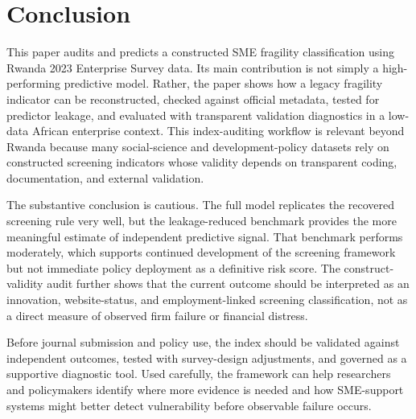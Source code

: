 \section{Conclusion}

This paper audits and predicts a constructed SME fragility classification using Rwanda 2023 Enterprise Survey data. Its main contribution is not simply a high-performing predictive model. Rather, the paper shows how a legacy fragility indicator can be reconstructed, checked against official metadata, tested for predictor leakage, and evaluated with transparent validation diagnostics in a low-data African enterprise context. This index-auditing workflow is relevant beyond Rwanda because many social-science and development-policy datasets rely on constructed screening indicators whose validity depends on transparent coding, documentation, and external validation.

The substantive conclusion is cautious. The full model replicates the recovered screening rule very well, but the leakage-reduced benchmark provides the more meaningful estimate of independent predictive signal. That benchmark performs moderately, which supports continued development of the screening framework but not immediate policy deployment as a definitive risk score. The construct-validity audit further shows that the current outcome should be interpreted as an innovation, website-status, and employment-linked screening classification, not as a direct measure of observed firm failure or financial distress.

Before journal submission and policy use, the index should be validated against independent outcomes, tested with survey-design adjustments, and governed as a supportive diagnostic tool. Used carefully, the framework can help researchers and policymakers identify where more evidence is needed and how SME-support systems might better detect vulnerability before observable failure occurs.
